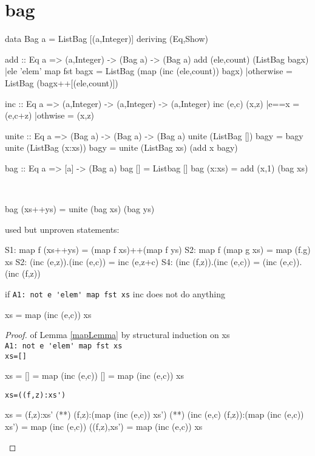 \section{bag}
\begin{code}
data Bag a = ListBag [(a,Integer)] deriving (Eq,Show)
\end{code}
\begin{code}
add :: Eq a => (a,Integer) -> (Bag a) -> (Bag a)
add (ele,count) (ListBag bagx)
    |ele 'elem' map fst bagx = ListBag (map (inc (ele,count)) bagx) 
    |otherwise               = ListBag (bagx++[(ele,count)])
\end{code}
\begin{code}
inc :: Eq a => (a,Integer) -> (a,Integer) -> (a,Integer)
inc (e,c) (x,z)
    |e==x    = (e,c+z)
    |othwise = (x,z)
\end{code}
\begin{code}
unite :: Eq a => (Bag a) -> (Bag a) -> (Bag a)
unite (ListBag [])     bagy = bagy
unite (ListBag (x:xs)) bagy = unite (ListBag xs) (add x bagy)
\end{code}
\begin{code}
bag :: Eq a => [a] -> (Bag a)
bag []     = Listbag []
bag (x:xs) = add (x,1) (bag xs)
\end{code}
\begin{claim}\label{bagClaim}\ 
\begin{code}
bag (xs++ys) = unite (bag xs) (bag ys) 
\end{code}
\end{claim}
used but unproven statements:
\begin{code}
S1: map f (xs++ys) = (map f xs)++(map f ys)
S2: map f (map g xs) = map (f.g) xs
S2: (inc (e,z)).(inc (e,c)) = inc (e,z+c)
S4: (inc (f,z)).(inc (e,c)) = (inc (e,c)).(inc (f,z))
\end{code}
\begin{lemma}\label{mapLemma}if \verb|A1: not e 'elem' map fst xs| inc does not do anything
\begin{code}
xs = map (inc (e,c)) xs
\end{code}
\end{lemma}
\begin{proof} of Lemma \ref{mapLemma} by structural induction on xs\\
\verb|A1: not e 'elem' map fst xs|\\
\verb|xs=[]|
\begin{code}
xs = []
   = map (inc (e,c)) []
   = map (inc (e,c)) xs
\end{code}
\verb|xs=((f,z):xs')|
\begin{code}
xs = (f,z):xs'
   (**) (f,z):(map (inc (e,c)) xs')
   (**) (inc (e,c) (f,z)):(map (inc (e,c)) xs')
   = map (inc (e,c)) ((f,z),xs')
   = map (inc (e,c)) xs
\end{code}
\end{proof}
